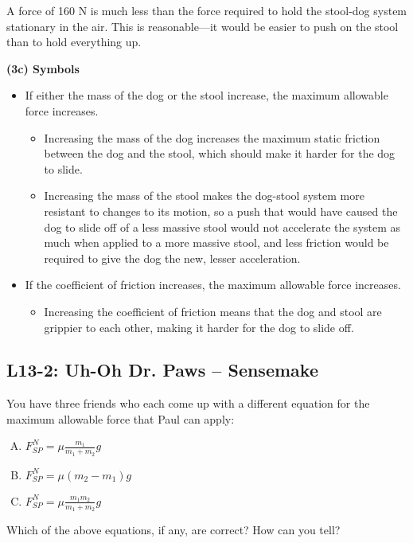 \documentclass[]{article}
\newcommand{\Week}{13}
\begin{document}
\begin{TeacherMargin}
\begin{itemize}
	A force of 160 N is much less than the force required to hold the stool-dog system stationary in the air. This is reasonable---it would be easier to push on the stool than to hold everything up.
\end{itemize}
\textbf{(3c) Symbols}
\begin{itemize}
	\item If either the mass of the dog or the stool increase, the maximum allowable force increases.
	\begin{itemize}
		\item Increasing the mass of the dog increases the maximum static friction between the dog and the stool, which should make it harder for the dog to slide.
		\item Increasing the mass of the stool makes the dog-stool system more resistant to changes to its motion, so a push that would have caused the dog to slide off of a less massive stool would not accelerate the system as much when applied to a more massive stool, and less friction would be required to give the dog the new, lesser acceleration.
	\end{itemize}
	\item If the coefficient of friction increases, the maximum allowable force increases.
	\begin{itemize}
		\item Increasing the coefficient of friction means that the dog and stool are grippier to each other, making it harder for the dog to slide off.
	\end{itemize}
\end{itemize}
\end{TeacherMargin}
\begin{PresentSpace}
\vspace{-10pt}
\section*{L\Week-2: Uh-Oh Dr. Paws -- Sensemake}
\vspace{-10pt}
You have three friends who each come up with a different equation for the maximum allowable force that Paul can apply:
\begin{enumerate}[(A)]
	\item $F^{N}_{SP} = \mu\frac{m_{1}}{m_{1}+m_{2}}g$
	\item $F^{N}_{SP} = \mu(m_{2}-m_{1})g$
	\item $F^{N}_{SP} = \mu\frac{m_{1}m_{2}}{m_{1}+m_{2}}g$
\end{enumerate}
Which of the above equations, if any, are correct? How can you tell?
\end{PresentSpace}
\end{document}
